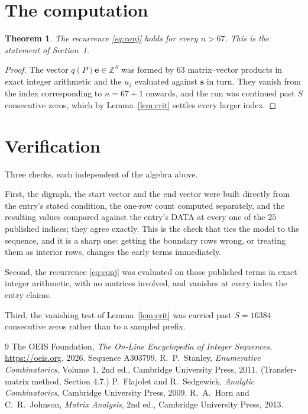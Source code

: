 \documentclass[11pt,a4paper]{article}
\theoremstyle{plain}
\newtheorem{theorem}{Theorem}
\theoremstyle{definition}
\begin{document}
\section{The computation}

\begin{theorem}
The recurrence \eqref{eq:conj} holds for every $n>67$. This is the statement of
Section~1.
\end{theorem}

\begin{proof}
The vector $q(P)\mathbf{e}\in\mathbb{Z}^{S}$ was formed by $63$ matrix--vector
products in exact integer arithmetic and the $u_j$ evaluated against $\mathbf{s}$ in turn.
They vanish from the index corresponding to $n=67+1$ onwards, and the run was continued
past $S$ consecutive zeros, which by Lemma~\ref{lem:crit} settles every larger index.
\end{proof}

\section{Verification}

Three checks, each independent of the algebra above.

First, the digraph, the start vector and the end vector were built directly from the
entry's stated condition, the one-row count computed separately, and the resulting values
compared against the entry's DATA at every one of the $25$ published indices; they
agree exactly. This is the check that ties the model to the sequence, and it is a sharp one:
getting the boundary rows wrong, or treating them as interior rows, changes the early terms
immediately.

Second, the recurrence \eqref{eq:conj} was evaluated on those published terms in exact
integer arithmetic, with no matrices involved, and vanishes at every index the entry claims.

Third, the vanishing test of Lemma~\ref{lem:crit} was carried past $S=16384$ consecutive
zeros rather than to a sampled prefix.

\begin{thebibliography}{9}
 The OEIS Foundation, \emph{The On-Line Encyclopedia of Integer
Sequences}, \url{https://oeis.org}, 2026. Sequence A303799.
 R.~P.~Stanley, \emph{Enumerative Combinatorics}, Volume 1, 2nd ed.,
Cambridge University Press, 2011. (Transfer-matrix method, Section 4.7.)
 P.~Flajolet and R.~Sedgewick, \emph{Analytic Combinatorics}, Cambridge
University Press, 2009.
 R.~A.~Horn and C.~R.~Johnson, \emph{Matrix Analysis}, 2nd ed., Cambridge
University Press, 2013.
\end{thebibliography}
\end{document}
